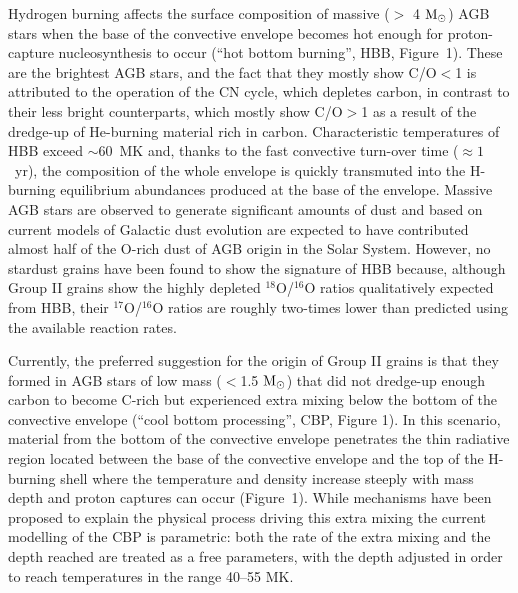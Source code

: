 \documentclass{nature}
\newcommand{\iso}[2]{\hbox{${}^{#1}${#2}}}
\newcommand{\msun}{\ensuremath{{\rm M}_{\odot}}}
\begin{document}
Hydrogen burning affects the surface composition of massive ($>$ 4 \msun) AGB 
stars when the base of the convective envelope becomes hot 
enough for proton-capture nucleosynthesis to occur\cite{ventura13} 
(``hot bottom burning'', 
HBB, Figure~1). These are the brightest AGB stars, and the fact that they 
mostly show C/O$<$1 is attributed to the operation of the CN cycle, 
which depletes carbon\cite{wood83}, 
in contrast to their less bright counterparts, which mostly show C/O$>$1 
as a result of the dredge-up of He-burning material rich in carbon.
Characteristic temperatures of HBB exceed $\sim$60~MK and,
thanks to the fast convective turn-over time ($\approx 1$~yr), 
the composition of the whole envelope is quickly transmuted into the H-burning equilibrium 
abundances produced at the base of the envelope. Massive AGB stars are observed to generate 
significant amounts of dust and based on current models of Galactic dust evolution
are expected to have 
contributed almost half of the O-rich dust of AGB origin in the Solar 
System\cite{gail09,zhukovska15}. However, no stardust grains have been found to show 
the signature of HBB because, although Group II grains show 
the highly depleted \iso{18}O/\iso{16}O ratios qualitatively expected from HBB, 
their \iso{17}O/\iso{16}O ratios 
are roughly
two-times lower than predicted\cite{lugaro07,iliadis08} 
using the available reaction rates\cite{iliadis10}. 

Currently, the preferred
suggestion for the origin of Group II grains is that 
they formed in AGB stars of low mass ($<$1.5 \msun) that did not dredge-up 
enough carbon to become C-rich but experienced  
extra mixing below the bottom of the 
convective envelope (``cool bottom processing'', CBP\cite{nollett03,palmerini11}, Figure 1). 
In this scenario, material from 
the bottom of the convective envelope penetrates the thin radiative region 
located between the base of the convective envelope and the top of the 
H-burning shell where the temperature and density increase steeply with   
mass depth and proton captures can occur (Figure~1).
While mechanisms 
have been proposed to explain the physical process driving this extra 
mixing\cite{nucci14} the current modelling of the CBP is parametric: 
both the rate of the extra mixing and the depth reached are treated 
as a free parameters, with the depth adjusted in order to reach temperatures 
in the range 40--55 MK.  

\end{document}
